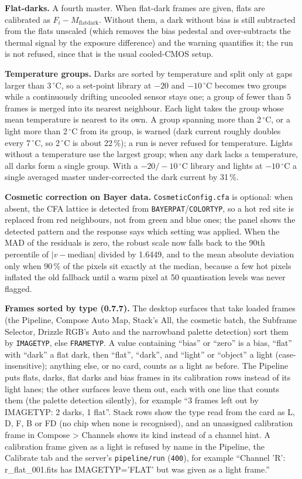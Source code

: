 \documentclass[11pt,a4paper]{article}
\newcommand{\code}[1]{\texttt{\small #1}}
\begin{document}
    \textbf{Flat-darks.} A fourth master. When flat-dark frames are given, flats are calibrated as $F_i - M_{\text{flatdark}}$. Without them, a dark without bias is still subtracted from the flats unscaled (which removes the bias pedestal and over-subtracts the thermal signal by the exposure difference) and the warning quantifies it; the run is not refused, since that is the usual cooled-CMOS setup.

    \textbf{Temperature groups.} Darks are sorted by temperature and split only at gaps larger than 3\,$^{\circ}$C, so a set-point library at $-20$ and $-10\,^{\circ}$C becomes two groups while a continuously drifting uncooled sensor stays one; a group of fewer than 5 frames is merged into its nearest neighbour. Each light takes the group whose mean temperature is nearest to its own. A group spanning more than 2\,$^{\circ}$C, or a light more than 2\,$^{\circ}$C from its group, is warned (dark current roughly doubles every 7\,$^{\circ}$C, so 2\,$^{\circ}$C is about 22\,\%); a run is never refused for temperature. Lights without a temperature use the largest group; when any dark lacks a temperature, all darks form a single group. With a $-20/-10\,^{\circ}$C library and lights at $-10\,^{\circ}$C a single averaged master under-corrected the dark current by 31\,\%.

    \textbf{Cosmetic correction on Bayer data.} \code{CosmeticConfig.cfa} is optional: when absent, the CFA lattice is detected from \code{BAYERPAT}/\code{COLORTYP}, so a hot red site is replaced from red neighbours, not from green and blue ones; the panel shows the detected pattern and the response says which setting was applied. When the MAD of the residuals is zero, the robust scale now falls back to the 90th percentile of $|v - \text{median}|$ divided by 1.6449, and to the mean absolute deviation only when 90\,\% of the pixels sit exactly at the median, because a few hot pixels inflated the old fallback until a warm pixel at 50 quantisation levels was never flagged.

    \textbf{Frames sorted by type (0.7.7).} The desktop surfaces that take loaded frames (the Pipeline, Compose Auto Map, Stack's All, the cosmetic batch, the Subframe Selector, Drizzle RGB's Auto and the narrowband palette detection) sort them by \code{IMAGETYP}, else \code{FRAMETYP}. A value containing ``bias'' or ``zero'' is a bias, ``flat'' with ``dark'' a flat dark, then ``flat'', ``dark'', and ``light'' or ``object'' a light (case-insensitive); anything else, or no card, counts as a light as before. The Pipeline puts flats, darks, flat darks and bias frames in its calibration rows instead of its light lanes; the other surfaces leave them out, each with one line that counts them (the palette detection silently), for example ``3 frames left out by IMAGETYP: 2 darks, 1 flat''. Stack rows show the type read from the card as L, D, F, B or FD (no chip when none is recognised), and an unassigned calibration frame in Compose \textgreater{} Channels shows its kind instead of a channel hint. A calibration frame given as a light is refused by name in the Pipeline, the Calibrate tab and the server's \code{pipeline/run} (\code{400}), for example ``Channel 'R': r\_flat\_001.fits has IMAGETYP='FLAT' but was given as a light frame.''
\end{document}
